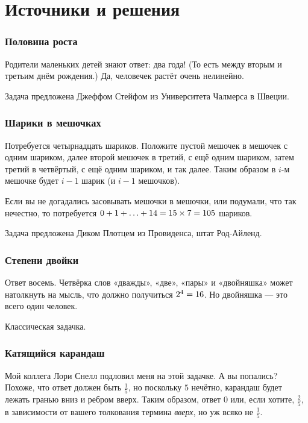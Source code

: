 \section*{Источники и решения}

\subsubsection*{Половина роста}

Родители маленьких детей знают ответ: два года!
(То есть между вторым и третьим днём рождения.)
Да, человечек растёт очень нелинейно.

Задача предложена Джеффом Стейфом из Университета Чалмерса в Швеции.

\subsubsection*{Шарики в мешочках}

Потребуется четырнадцать шариков.
Положите пустой мешочек в мешочек с одним шариком, 
далее второй мешочек в третий, с ещё одним шариком, затем третий в четвёртый, с ещё одним шариком, и так далее.
Таким образом в $i$-м мешочке будет $i-1$ шарик (и $i-1$ мешочков).

Если вы не догадались засовывать мешочки в мешочки, или подумали, что так нечестно, то потребуется $0 + 1 \z+ \z\dots \z+ 14 \z= 15 \times 7 \z= 105$ шариков.

Задача предложена Диком Плотцем из Провиденса, штат Род-Айленд.

\subsubsection*{Степени двойки}

Ответ восемь.
Четвёрка слов «дважды», «две», «пары» и «двойняшка» может натолкнуть на мысль, что должно получиться $2^4 \z= 16$.
Но двойняшка — это всего один человек.

Классическая задачка.

\subsubsection*{Катящийся карандаш}

Мой коллега Лори Снелл подловил меня на этой задачке.
А вы попались?
Похоже, что ответ должен быть $\tfrac15$, но поскольку $5$ нечётно, карандаш будет лежать гранью вниз и ребром вверх.
Таким образом, ответ $0$ или, если хотите, $\tfrac25$, в зависимости от вашего толкования термина \emph{вверх}, но уж всяко не $\tfrac15$.

